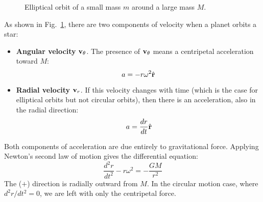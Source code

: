 \documentclass[11pt]{article}
\newcommand{\mb}[1]{
  \ensuremath\mathbf{#1}
}
\begin{document}
\begin{figure}[!ht]
  \centering
  \caption{Elliptical orbit of a small mass $m$ around a large mass $M$.}
  \label{eorbit}
\end{figure}


As shown in Fig.~\ref{eorbit}, there are two components of velocity when a
planet orbits a star:
\begin{itemize}
\item\textbf{Angular velocity} $\mb{v}_\theta$. The presence of $\mb{v}_\theta$
  means a centripetal acceleration toward $M$:
  \begin{equation}
    a=-r\omega^2\hat{\mb{r}}
  \end{equation}
\item\textbf{Radial velocity} $\mb{v}_r$. If this velocity changes with time
  (which is the case for elliptical orbits but not circular orbits), then there
  is an acceleration, also in the radial direction:
  \begin{equation}
    a=\frac{dr}{dt}\hat{\mb{r}}
  \end{equation}
\end{itemize}
Both components of acceleration are due entirely to gravitational force.
Applying Newton's second law of motion gives the differential equation:
\begin{equation}
  \frac{d^2r}{dt^2}-r\omega^2=-\frac{GM}{r^2}
  \label{ode1}
\end{equation}
The ($+$) direction is radially outward from $M$. In the circular motion case,
where $d^2r/dt^2=0$, we are left with only the centripetal force.
\end{document}
